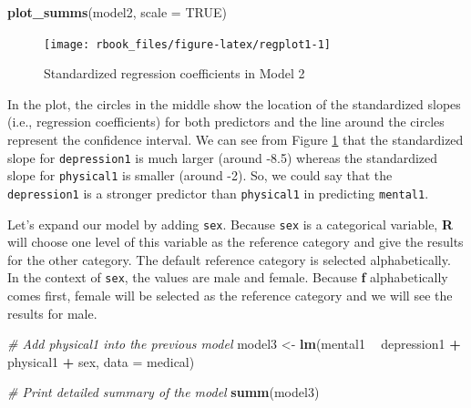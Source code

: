 \documentclass[]{book}
\newenvironment{Shaded}{\begin{snugshade}}{\end{snugshade}}
\newcommand{\CommentTok}[1]{\textcolor[rgb]{0.56,0.35,0.01}{\textit{#1}}}
\newcommand{\DataTypeTok}[1]{\textcolor[rgb]{0.13,0.29,0.53}{#1}}
\newcommand{\KeywordTok}[1]{\textcolor[rgb]{0.13,0.29,0.53}{\textbf{#1}}}
\newcommand{\NormalTok}[1]{#1}
\newcommand{\OperatorTok}[1]{\textcolor[rgb]{0.81,0.36,0.00}{\textbf{#1}}}
\newcommand{\OtherTok}[1]{\textcolor[rgb]{0.56,0.35,0.01}{#1}}
\newcommand{\StringTok}[1]{\textcolor[rgb]{0.31,0.60,0.02}{#1}}
\begin{document}
\begin{Shaded}
\begin{Highlighting}[]
\KeywordTok{plot_summs}\NormalTok{(model2, }\DataTypeTok{scale =} \OtherTok{TRUE}\NormalTok{)}
\end{Highlighting}
\end{Shaded}

\begin{figure}

{\centering \texttt{[image: rbook\_files/figure-latex/regplot1-1]} 

}

\caption{Standardized regression coefficients in Model 2}\label{fig:regplot1}
\end{figure}

In the plot, the circles in the middle show the location of the standardized slopes (i.e., regression coefficients) for both predictors and the line around the circles represent the confidence interval. We can see from Figure \ref{fig:regplot1} that the standardized slope for \texttt{depression1} is much larger (around -8.5) whereas the standardized slope for \texttt{physical1} is smaller (around -2). So, we could say that the \texttt{depression1} is a stronger predictor than \texttt{physical1} in predicting \texttt{mental1}.

Let's expand our model by adding \texttt{sex}. Because \texttt{sex} is a categorical variable, \textbf{R} will choose one level of this variable as the reference category and give the results for the other category. The default reference category is selected alphabetically. In the context of \texttt{sex}, the values are male and female. Because \textbf{f} alphabetically comes first, female will be selected as the reference category and we will see the results for male.

\begin{Shaded}
\begin{Highlighting}[]
\CommentTok{# Add physical1 into the previous model}
\NormalTok{model3 <-}\StringTok{ }\KeywordTok{lm}\NormalTok{(mental1 }\OperatorTok{~}\StringTok{ }\NormalTok{depression1 }\OperatorTok{+}\StringTok{ }\NormalTok{physical1 }\OperatorTok{+}\StringTok{ }\NormalTok{sex, }\DataTypeTok{data =}\NormalTok{ medical)}

\CommentTok{# Print detailed summary of the model}
\KeywordTok{summ}\NormalTok{(model3)}
\end{Highlighting}
\end{Shaded}
\end{document}
